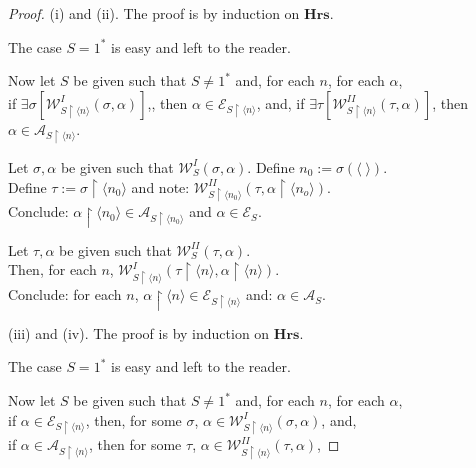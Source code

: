 \documentclass[a4paper]{amsart}
\theoremstyle{plain}
\begin{document}
 \begin{proof} (i) and (ii).  The proof is by induction on $\mathbf{Hrs}$. 
 
 The case $S=1^\ast$ is easy and left to the reader. 
 


 Now let $S$ be given such that $S\neq 1^\ast$ and, for each $n$, for each $\alpha$, \\ if $\exists \sigma[\mathcal{W}_{S\upharpoonright\langle n \rangle}^I(\sigma, \alpha)]$,, then $\alpha \in \mathcal{E}_{S\upharpoonright\langle n \rangle}$, and,  if $\exists \tau[\mathcal{W}_{S\upharpoonright\langle n \rangle}^{II}(\tau, \alpha)]$, then $\alpha \in \mathcal{A}_{S\upharpoonright\langle n \rangle}$.
 
 \smallskip Let $\sigma, \alpha$ be given such that $\mathcal{W}^I_S(\sigma, \alpha)$.  Define $n_0:=\sigma(\langle \;\rangle)$. 
  \\ Define  $\tau:=\sigma\upharpoonright \langle n_0\rangle$ and note:  $\mathcal{W}^{II}_{S\upharpoonright\langle n_0\rangle}(\tau, \alpha\upharpoonright\langle n_o\rangle)$. \\ Conclude: $\alpha\upharpoonright\langle n_0\rangle \in \mathcal{A}_{S\upharpoonright\langle n_0\rangle}$ and $\alpha \in \mathcal{E}_S$.
  
  \smallskip  Let $\tau, \alpha$ be given such that $\mathcal{W}_S^{II}(\tau, \alpha)$. 
  \\Then, for each $n$, $\mathcal{W}_{S\upharpoonright\langle n \rangle}^I(\tau\upharpoonright \langle n \rangle, \alpha\upharpoonright\langle n \rangle)$.  \\Conclude: for each $n$, $\alpha\upharpoonright\langle n \rangle \in \mathcal{E}_{S\upharpoonright\langle n \rangle}$ and: $\alpha \in \mathcal{A}_S$. 
  
  \smallskip (iii) and (iv). The proof is by induction on $\mathbf{Hrs}$. 
 
 The case $S=1^\ast$ is easy and left to the reader. 
 


 Now let $S$ be given such that $S\neq 1^\ast$ and, for each $n$, for each $\alpha$, \\ if $ \alpha \in \mathcal{E}_{S\upharpoonright\langle n \rangle} $, then, for some $\sigma$,  $\alpha \in \mathcal{W}^I_{S\upharpoonright\langle n \rangle}(\sigma, \alpha)$, and,  \\if $ \alpha \in \mathcal{A}_{S\upharpoonright\langle n \rangle} $, then for some $\tau$,  $\alpha \in \mathcal{W}^{II}_{S\upharpoonright\langle n \rangle}(\tau, \alpha)$, 
 

\end{proof}
\end{document}
